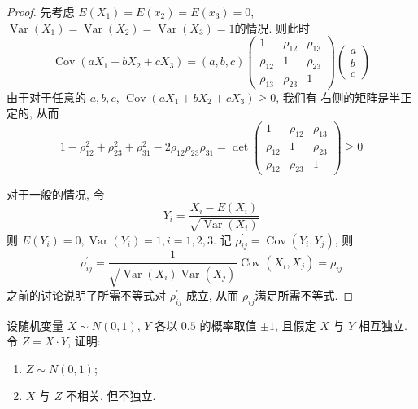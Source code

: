 \documentclass[../main.tex]{subfiles}
\begin{document}
\begin{proof}
  先考虑 \(  E\left( X_1 \right)= E\left( x_2 \right)= E\left( x_3 \right)= 0     \), \(  \operatorname{Var}\left( X_1 \right)= \operatorname{Var}\left( X_2 \right)= \operatorname{Var}\left( X_3 \right)= 1     \)的情况.  则此时 \[
  \operatorname{Cov}\left( aX_1+ bX_2+ cX_3 \right)= \left( a,b,c \right)\begin{pmatrix} 
      1&\rho_{12}&\rho _{13}\\ 
       \rho _{12}&1&\rho _{23}\\ 
        \rho _{13}&\rho _{23}&1 
  \end{pmatrix}\begin{pmatrix} 
      a\\ 
       b\\ 
        c 
  \end{pmatrix}    
  \]由于对于任意的 \(  a,b,c  \), \(  \operatorname{Cov}\left( aX_1+ bX_2+ cX_3 \right)\ge 0   \), 我们有 右侧的矩阵是半正定的, 从而 \[
  1-\rho _{12}^{2}+ \rho _{23}^{2}+ \rho _{31}^{2}-2\rho _{12}\rho _{23}\rho _{31}= \det \begin{pmatrix} 
      1&\rho _{12}&\rho _{13}\\ 
       \rho _{12}&1&\rho _{23}\\ 
        \rho _{12}&\rho _{23}&1 
  \end{pmatrix}\ge 0 
  \]  

  对于一般的情况, 令 \[
  Y_{i}= \frac{X_{i}-E\left( X_{i} \right)  }{\sqrt{\operatorname{Var}\left( X_{i} \right) } } 
  \]则 \(  E\left( Y_{i} \right)= 0, \operatorname{Var}\left( Y_{i} \right)= 1    ,i= 1,2,3\). 记 \(  \rho _{ij}^{\prime} = \operatorname{Cov}\left( Y_{i},Y_{j} \right)   \), 则 \[
 \rho _{ij}^{\prime} = \frac{1 }{\sqrt{\operatorname{Var}\left( X_{i} \right)\operatorname{Var}\left( X_{j} \right)  } }\operatorname{Cov}\left( X_{i},X_{j} \right)= \rho _{ij}
  \] 之前的讨论说明了所需不等式对 \(  \rho _{ij}^{\prime}   \) 成立, 从而 \(  \rho _{ij}  \)满足所需不等式. 
\end{proof}

\begin{exercise}{}{}
设随机变量 $X\sim N(0,1)$, $Y$ 各以 $0.5$ 的概率取值 $\pm 1$, 且假定 $X$ 与 $Y$ 相互独立. 令 $Z=X\cdot Y$, 证明:
\begin{enumerate}
\item $Z\sim N(0,1)$;
\item $X$ 与 $Z$ 不相关, 但不独立.
\end{enumerate}
\end{exercise}
\end{document}
